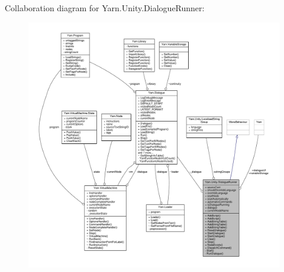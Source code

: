 Collaboration diagram for Yarn.\-Unity.\-Dialogue\-Runner\-:
\nopagebreak
\begin{figure}[H]
\begin{center}
\leavevmode
\includegraphics[width=350pt]{a00687}
\end{center}
\end{figure}
